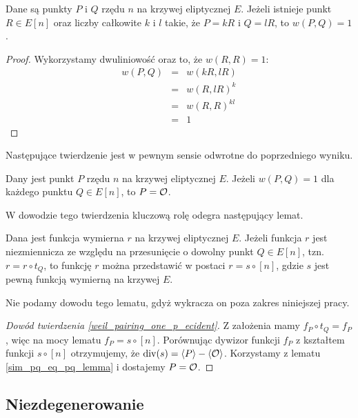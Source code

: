 \begin{theorem}
Dane są punkty $P$ i $Q$ rzędu $n$ na krzywej eliptycznej $E$.
Jeżeli istnieje punkt $R \in E[n]$ oraz liczby całkowite $k$ i $l$
takie, że $P = kR$ i $Q = lR$, to $w(P, Q) = 1$.
\end{theorem}

\begin{proof}
Wykorzystamy dwuliniowość oraz to, że $w(R, R) = 1$:
\begin{eqnarray*}
w(P, Q)
& = & w(kR, lR) \\
& = & w(R, lR)^k \\
& = & w(R, R)^{kl} \\
& = & 1
\end{eqnarray*}
\end{proof}

\noindent
Następujące twierdzenie jest w pewnym sensie odwrotne do poprzedniego wyniku.

\begin{theorem}\label{weil_pairing_one_p_ecident}
Dany jest punkt $P$ rzędu $n$ na krzywej eliptycznej $E$.
Jeżeli $w(P, Q) = 1$ dla każdego punktu $Q \in E[n]$, to $P = \mathcal{O}$.
\end{theorem}

\noindent
W dowodzie tego twierdzenia kluczową rolę odegra następujący lemat.

\begin{lemma}
Dana jest funkcja wymierna $r$ na krzywej eliptycznej $E$.
Jeżeli funkcja $r$ jest niezmiennicza ze względu na przesunięcie
o dowolny punkt $Q \in E[n]$, tzn. $r = r \circ t_Q$,
to funkcję $r$ można przedstawić w postaci $r = s \circ [n]$,
gdzie $s$ jest pewną funkcją wymierną na krzywej $E$.
\end{lemma}

\noindent
Nie podamy dowodu tego lematu, gdyż wykracza on poza zakres niniejszej pracy.

\begin{proof}[Dowód twierdzenia \ref{weil_pairing_one_p_ecident}]
Z założenia mamy $f_P \circ t_Q = f_P$,
więc na mocy lematu $f_P = s \circ [n]$.
Porównując dywizor funkcji $f_P$ z kształtem funkcji $s \circ [n]$
otrzymujemy, że $\operatorname{div}(s) = \left\langle P\right\rangle - \left\langle\mathcal{O}\right\rangle$.
Korzystamy z lematu \ref{sim_pq_eq_pq_lemma} i dostajemy $P = \mathcal{O}$.
\end{proof}

\subsection*{Niezdegenerowanie}

